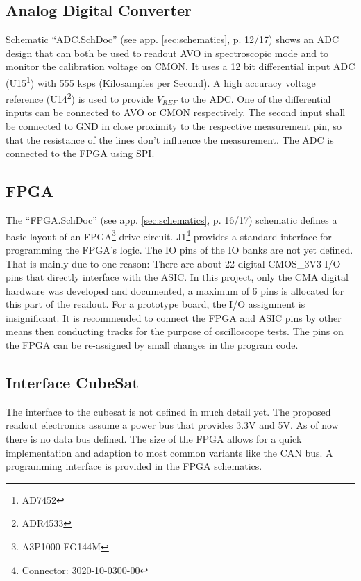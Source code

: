 \subsection{Analog Digital Converter}
\label{sec:adc}
Schematic ``ADC.SchDoc'' (see app. \ref{sec:schematics}, p. 12/17) shows an ADC design that can both be used to readout AVO in spectroscopic mode and to monitor the calibration voltage on CMON.
It uses a 12 bit differential input ADC (U15\footnote{AD7452}) with 555 ksps (Kilosamples per Second).
A high accuracy voltage reference (U14\footnote{ADR4533}) is used to provide $V_{REF}$ to the ADC.
One of the differential inputs can be connected to AVO or CMON respectively.
The second input shall be connected to GND in close proximity to the respective measurement pin, so that the resistance of the lines don't influence the measurement.
The ADC is connected to the FPGA using SPI.

\subsection{FPGA}
\label{sec:FPGA}
The ``FPGA.SchDoc'' (see app. \ref{sec:schematics}, p. 16/17) schematic defines a basic layout of an FPGA\footnote{A3P1000-FG144M} drive circuit.
J1\footnote{Connector: 3020-10-0300-00} provides a standard interface for programming the FPGA's logic.
The IO pins of the IO banks are not yet defined. 
That is mainly due to one reason:
There are about 22 digital CMOS\_3V3 I/O pins that directly interface with the ASIC. 
In this project, only the CMA digital hardware was developed and documented, a maximum of 6 pins is allocated for this part of the readout. 
For a prototype board, the I/O assignment is insignificant. 
It is recommended to connect the FPGA and ASIC pins by other means then conducting tracks for the purpose of oscilloscope tests. 
The pins on the FPGA can be re-assigned by small changes in the program code.

\subsection{Interface CubeSat}
\label{sec:interface_cubesat}
The interface to the cubesat is not defined in much detail yet.
The proposed readout electronics assume a power bus that provides 3.3V and 5V.
As of now there is no data bus defined.
The size of the FPGA allows for a quick implementation and adaption to most common variants like the CAN bus.
A programming interface is provided in the FPGA schematics.

